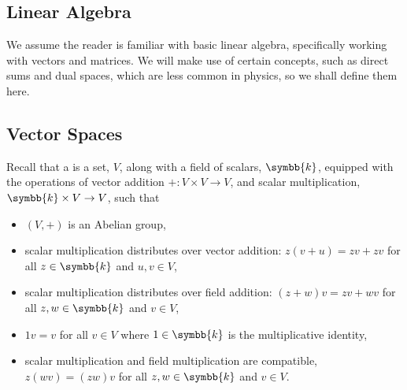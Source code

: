 \documentclass[fleqn]{NotesClass}
\renewcommand{\field}{\symbb{k}}
\begin{document}
    
    
    
    
    
    
    
    \printbibliography
    \appendixpage
    \begin{appendices}
        \chapter{Linear Algebra}\label{sec:linear algebra}
        We assume the reader is familiar with basic linear algebra, specifically working with vectors and matrices.
        We will make use of certain concepts, such as direct sums and dual spaces, which are less common in physics, so we shall define them here.
        
        \section{Vector Spaces}
        Recall that a  is a set, \(V\), along with a field of scalars, \(\field\), equipped with the operations of vector addition \(+ \colon V \times V \to V\), and scalar multiplication, \(\field \times V \to V\), such that
        \begin{itemize}
            \item \((V, +)\) is an Abelian group,
            \item scalar multiplication distributes over vector addition: \(z(v + u) = zv + zv\) for all \(z \in \field\) and \(u, v \in V\),
            \item scalar multiplication distributes over field addition: \((z + w)v = zv + wv\) for all \(z, w \in \field\) and \(v \in V\),
            \item \(1v = v\) for all \(v \in V\) where \(1 \in \field\) is the multiplicative identity,
            \item scalar multiplication and field multiplication are compatible, \(z(wv) = (zw)v\) for all \(z, w \in \field\) and \(v \in V\).
        \end{itemize}
        

\end{appendices}
\end{document}

